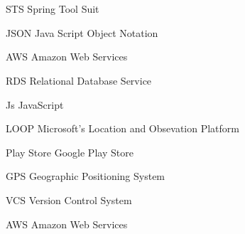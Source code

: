 \newpage
\chapter*{\abbreviationName}
\vspace{-0.3em}


\begin{abbrv}
\item[STS]                 Spring Tool Suit
\item[JSON]					Java Script Object Notation
\item[AWS]					Amazon Web Services
\item[RDS]				    Relational Database Service
\item[Js]					JavaScript
\item[LOOP]					Microsoft's Location and Obsevation Platform
\item[Play Store]			Google Play Store
\item[GPS]					Geographic Positioning System
\item[VCS]					Version Control System
\item[AWS]					Amazon Web Services
\end{abbrv}